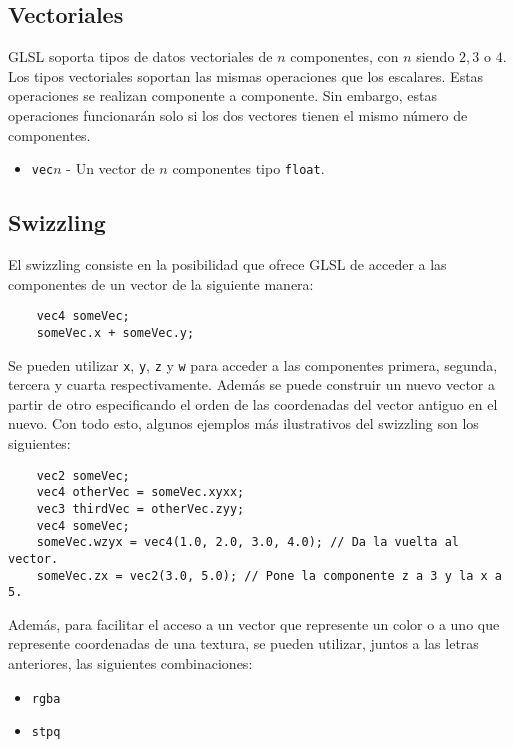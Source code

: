 \subsection{Vectoriales}

GLSL soporta tipos de datos vectoriales de $n$ componentes, con $n$ siendo $2,
3$ o $4$. Los tipos vectoriales soportan las mismas operaciones que los
escalares. Estas operaciones se realizan componente a componente. Sin embargo,
estas operaciones funcionarán solo si los dos vectores tienen el mismo número de
componentes.

\begin{itemize}
		\item \verb|vec|$n$ - Un vector de $n$ componentes tipo
				\verb|float|.
\end{itemize}

\subsection{Swizzling}

El swizzling consiste en la posibilidad que ofrece GLSL de acceder a las
componentes de un vector de la siguiente manera:

\begin{verbatim}
    vec4 someVec;
    someVec.x + someVec.y;
\end{verbatim}

Se pueden utilizar \verb|x|, \verb|y|, \verb|z| y \verb|w| para acceder a las
componentes primera, segunda, tercera y cuarta respectivamente. Además se puede
construir un nuevo vector a partir de otro especificando el orden de las
coordenadas del vector antiguo en el nuevo. Con todo esto, algunos ejemplos más
ilustrativos del swizzling son los siguientes:

\begin{verbatim}
    vec2 someVec;
    vec4 otherVec = someVec.xyxx;
    vec3 thirdVec = otherVec.zyy;	
    vec4 someVec;
    someVec.wzyx = vec4(1.0, 2.0, 3.0, 4.0); // Da la vuelta al vector.
    someVec.zx = vec2(3.0, 5.0); // Pone la componente z a 3 y la x a 5.
\end{verbatim}

Además, para facilitar el acceso a un vector que represente un color o a uno que
represente coordenadas  de una textura, se pueden utilizar, juntos a las letras
anteriores, las siguientes combinaciones:

\begin{itemize}
		\item \verb|rgba|
		\item \verb|stpq|
\end{itemize}

